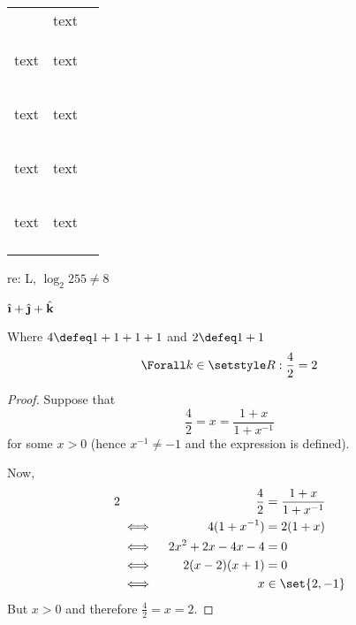 \begin{longtable}{*3c}
\begin{tabular}{*2c}
\begin{large}text\end{large} &
{\large text} \\
\begin{Large}text\end{Large} &
{\Large text} \\
\begin{LARGE}text\end{LARGE} &
{\LARGE text} \\
\begin{huge}text\end{huge} &
{\huge text} \\
\begin{Huge}text\end{Huge} &
{\Huge text} \\
\end{tabular} \\
\end{longtable}

re: L, \(\log_2 255 \ne 8\)

\(\uveci + \uvecj + \uveck\)

\begin{lemma}
Where \(4 \defeq 1 + 1 + 1 + 1\) and \(2 \defeq 1 + 1\)
\begin{equation}
\Forall k \in \Reals: \frac 42 = 2
\end{equation}
\end{lemma}

\begin{proof}
Suppose that
\begin{equation*}
\frac 42 = x = \frac{1 + x}{1 + x^{-1}}
\end{equation*}
for some \(x > 0\) (hence \(x^{-1} \neq -1\) and the expression is defined).

Now,
\begin{alignat*} 2
 &&\frac 42 &= \frac{1 + x}{1 + x^{-1}} \\
 &\iff{}& 4(1 + x^{-1}) &= 2(1 + x) \\
 &\iff{}& 2x^2 + 2x - 4x - 4 &= 0 \\
 &\iff{}& 2(x - 2)(x + 1) &= 0 \\
 &\iff{}& x &\in \set{2, -1} \\
\end{alignat*}
But \(x > 0\) and therefore \(\frac 42 = x = 2\).
\end{proof}

